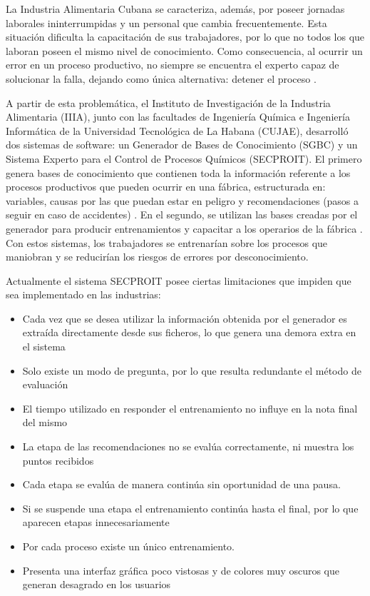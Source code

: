 La Industria Alimentaria Cubana se caracteriza, además, por poseer jornadas laborales ininterrumpidas y un personal que cambia frecuentemente. Esta situación dificulta la capacitación de sus trabajadores, por lo que no todos los que laboran poseen el mismo nivel de conocimiento. Como consecuencia, al ocurrir un error en un proceso productivo, no siempre se encuentra el experto capaz de solucionar la falla, dejando como única alternativa: detener el proceso \cite{Lemus2018}.

A partir de esta problemática, el Instituto de Investigación de la Industria Alimentaria (IIIA), junto con las facultades de Ingeniería Química e Ingeniería Informática de la Universidad Tecnológica de La Habana (CUJAE), desarrolló dos sistemas de software: un Generador de Bases de Conocimiento (SGBC) y  un Sistema Experto para el Control de Procesos Químicos (SECPROIT). El primero genera bases de conocimiento que contienen toda la información referente a los procesos productivos que pueden ocurrir en una fábrica, estructurada en: variables, causas por las que puedan estar en peligro y recomendaciones (pasos a seguir en caso de accidentes)  \cite{Riveron2017}. En el segundo, se utilizan las bases creadas por el generador para producir entrenamientos y capacitar a los operarios de la fábrica \cite{ElenaAcostaGil2018}. Con estos sistemas, los trabajadores se entrenarían sobre los procesos que maniobran y se reducirían los riesgos de errores por desconocimiento.

Actualmente el sistema SECPROIT posee ciertas limitaciones que impiden que sea implementado en las industrias:
\begin{itemize}
\item Cada vez que se desea utilizar la información obtenida por el generador es extraída directamente desde sus ficheros, lo que genera una demora extra en el sistema
\item Solo existe un modo de pregunta, por lo que resulta redundante el método de evaluación
\item El tiempo utilizado en responder el entrenamiento no influye en la nota final del mismo
\item La etapa de las recomendaciones no se evalúa correctamente, ni muestra los puntos recibidos
\item Cada etapa se evalúa de manera continúa sin oportunidad de una pausa.
\item Si se suspende una etapa el entrenamiento continúa hasta el final, por lo que aparecen etapas innecesariamente
\item Por cada proceso existe un único entrenamiento.
\item Presenta una interfaz gráfica poco vistosas y de colores muy oscuros que generan desagrado en los usuarios
\end{itemize}

